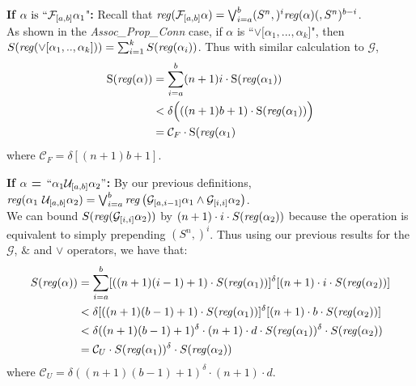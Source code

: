 \documentclass[runningheads]{llncs}
\begin{document}
 \textbf{If} $\alpha \text{ is } ``\mathcal{F}_{[a,b]} \alpha_{1}$"\textbf{:}
 Recall that $\text{\emph{reg}}(\mathcal{F}_{[a,b]} \alpha) = \bigvee_{i=a}^{b} (S^n,)^i \text{\emph{reg}}(\alpha)(,S^n)^{b-i}$. \\
 As shown in the \textit{Assoc\_Prop\_Conn} case, if $\alpha$ is ``$\lor[\alpha_1, ... ,\alpha_k$]", then \\
 $S(\text{\emph{reg}}(\lor [\alpha_{1}, .., \alpha_{k}])) = 
    \sum_{i=1}^{k} S(\text{\emph{reg}}(\alpha_{i}))$. Thus with similar calculation to $\mathcal{G}$,
 \begin{align*}
     \text{S(\emph{reg}}(\alpha)) &= \sum_{i=a}^{b} (n+1)i \cdot \text{S(\emph{reg}}(\alpha_{1})) \\
     &< \delta\Bigl(((n+1)b+1) \cdot \text{S(\emph{reg}}(\alpha_1))\Bigl) \\
     &= \mathcal{C}_{F} \cdot \text{S(\emph{reg}}(\alpha_1)
 \end{align*}
 where $\mathcal{C}_{F} = \delta[(n+1)b+1]$.
 
 \textbf{If $\alpha$ = $``\alpha_1 \mathcal{U}_{[a, b]} \alpha_2"$:}
    By our previous definitions, 
    $\text{\emph{reg}}(\alpha_1 \ \mathcal{U}_{[a,b]} \alpha_2) =  \bigvee_{i=a}^{b} \text{\emph{reg}}\left(\mathcal{G}_{[a,i-1]}\alpha_1 \land \mathcal{G}_{[i, i]} \alpha_2\right)$. \\
    We can bound $S(\text{\emph{reg}}(\mathcal{G}_{[i, i]} \alpha_2))$ by $(n+1) \cdot i \cdot S(\text{\emph{reg}}(\alpha_2))$ because the operation is equivalent to simply prepending $(S^n ,)^i$.
    Thus using our previous results for the $\mathcal{G}$, $\&$ and $\lor$ operators, we have that:
    \begin{align*}
        S(\text{\emph{reg}}(\alpha)) &= 
        \sum_{i = a}^b [((n+1)(i-1) + 1) \cdot S(\text{\emph{reg}}(\alpha_1))]^\delta 
        [(n+1) \cdot i \cdot S(\text{\emph{reg}}(\alpha_2))] \\
        &< \delta [((n+1)(b-1) + 1) \cdot S(\text{\emph{reg}}(\alpha_1))]^\delta 
        [(n+1) \cdot b \cdot S(\text{\emph{reg}}(\alpha_2))] \\
        &< \delta ((n+1)(b-1) + 1)^\delta \cdot (n+1) \cdot d \cdot S(\text{\emph{reg}}(\alpha_1))^\delta \cdot S(\text{\emph{reg}}(\alpha_2)) \\
        &= \mathcal{C}_U \cdot S(\text{\emph{reg}}(\alpha_1))^\delta \cdot S(\text{\emph{reg}}(\alpha_2))
    \end{align*}
    where $\mathcal{C}_U = \delta ((n+1)(b-1) + 1)^\delta \cdot (n+1) \cdot d$.
 
\end{document}
